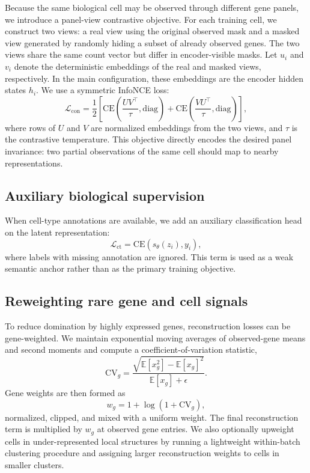 Because the same biological cell may be observed through different gene panels, we
introduce a panel-view contrastive objective. For each training cell, we construct two
views: a real view using the original observed mask and a masked view generated by
randomly hiding a subset of already observed genes. The two views share the same count
vector but differ in encoder-visible masks. Let \(u_i\) and \(v_i\) denote the
deterministic embeddings of the real and masked views, respectively. In the main
configuration, these embeddings are the encoder hidden states \(h_i\). We use a
symmetric InfoNCE loss:
\begin{equation}
    \mathcal{L}_{\mathrm{con}}
    =
    \frac{1}{2}
    \left[
    \mathrm{CE}
    \left(
        \frac{UV^{\top}}{\tau}, \mathrm{diag}
    \right)
    +
    \mathrm{CE}
    \left(
        \frac{VU^{\top}}{\tau}, \mathrm{diag}
    \right)
    \right],
\end{equation}
where rows of \(U\) and \(V\) are normalized embeddings from the two views, and
\(\tau\) is the contrastive temperature. This objective directly encodes the desired
panel invariance: two partial observations of the same cell should map to nearby
representations.

\subsection{Auxiliary biological supervision}

When cell-type annotations are available, we add an auxiliary classification head on
the latent representation:
\begin{equation}
    \mathcal{L}_{\mathrm{ct}}
    =
    \mathrm{CE}\left(s_{\theta}(z_i), y_i\right),
\end{equation}
where labels with missing annotation are ignored. This term is used as a weak semantic
anchor rather than as the primary training objective.

\subsection{Reweighting rare gene and cell signals}

To reduce domination by highly expressed genes, reconstruction losses can be
gene-weighted. We maintain exponential moving averages of observed-gene means and
second moments and compute a coefficient-of-variation statistic,
\begin{equation}
    \mathrm{CV}_g =
    \frac{\sqrt{\mathbb{E}[x_g^2] - \mathbb{E}[x_g]^2}}
         {\mathbb{E}[x_g] + \epsilon}.
\end{equation}
Gene weights are then formed as
\begin{equation}
    w_g = 1 + \log(1+\mathrm{CV}_g),
\end{equation}
normalized, clipped, and mixed with a uniform weight. The final reconstruction term is
multiplied by \(w_g\) at observed gene entries. We also optionally upweight cells in
under-represented local structures by running a lightweight within-batch clustering
procedure and assigning larger reconstruction weights to cells in smaller clusters.

